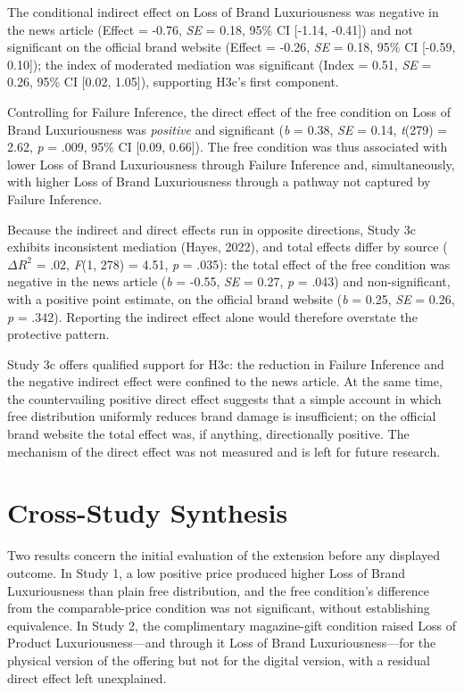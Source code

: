 \documentclass[12pt, a4paper]{article}
\begin{document}
The conditional indirect effect on Loss of Brand Luxuriousness was negative in the news article (Effect = -0.76, \emph{SE} = 0.18, 95\% CI {[}-1.14, -0.41{]}) and not significant on the official brand website (Effect = -0.26, \emph{SE} = 0.18, 95\% CI {[}-0.59, 0.10{]}); the index of moderated mediation was significant (Index = 0.51, \emph{SE} = 0.26, 95\% CI {[}0.02, 1.05{]}), supporting H3c's first component.

Controlling for Failure Inference, the direct effect of the free condition on Loss of Brand Luxuriousness was \emph{positive} and significant (\emph{b} = 0.38, \emph{SE} = 0.14, \emph{t}(279) = 2.62, \emph{p} = .009, 95\% CI {[}0.09, 0.66{]}). The free condition was thus associated with lower Loss of Brand Luxuriousness through Failure Inference and, simultaneously, with higher Loss of Brand Luxuriousness through a pathway not captured by Failure Inference.

Because the indirect and direct effects run in opposite directions, Study 3c exhibits inconsistent mediation (Hayes, 2022), and total effects differ by source ($\Delta R^2$ = .02, \emph{F}(1, 278) = 4.51, \emph{p} = .035): the total effect of the free condition was negative in the news article (\emph{b} = -0.55, \emph{SE} = 0.27, \emph{p} = .043) and non-significant, with a positive point estimate, on the official brand website (\emph{b} = 0.25, \emph{SE} = 0.26, \emph{p} = .342). Reporting the indirect effect alone would therefore overstate the protective pattern.

Study 3c offers qualified support for H3c: the reduction in Failure Inference and the negative indirect effect were confined to the news article. At the same time, the countervailing positive direct effect suggests that a simple account in which free distribution uniformly reduces brand damage is insufficient; on the official brand website the total effect was, if anything, directionally positive. The mechanism of the direct effect was not measured and is left for future research.

\section{Cross-Study Synthesis}

Two results concern the initial evaluation of the extension before any displayed outcome. In Study 1, a low positive price produced higher Loss of Brand Luxuriousness than plain free distribution, and the free condition's difference from the comparable-price condition was not significant, without establishing equivalence. In Study 2, the complimentary magazine-gift condition raised Loss of Product Luxuriousness---and through it Loss of Brand Luxuriousness---for the physical version of the offering but not for the digital version, with a residual direct effect left unexplained.
\end{document}

